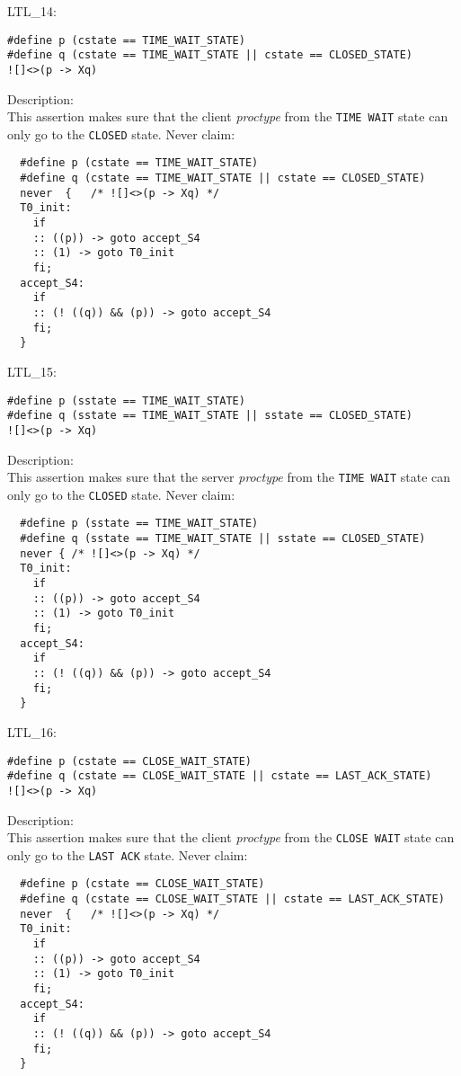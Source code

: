 \documentclass{WigReport}
\begin{document}
LTL\_14:\\
\begin{lstlisting}
#define p (cstate == TIME_WAIT_STATE)
#define q (cstate == TIME_WAIT_STATE || cstate == CLOSED_STATE)
![]<>(p -> Xq)
\end{lstlisting}
Description:\\
This assertion makes sure that the client \textit{proctype} from the \verb|TIME WAIT| state can only go to the \verb|CLOSED| state.
Never claim:\\
\begin{lstlisting}
  #define p (cstate == TIME_WAIT_STATE)
  #define q (cstate == TIME_WAIT_STATE || cstate == CLOSED_STATE)
  never  {   /* ![]<>(p -> Xq) */
  T0_init:
    if
    :: ((p)) -> goto accept_S4
    :: (1) -> goto T0_init
    fi;
  accept_S4:
    if
    :: (! ((q)) && (p)) -> goto accept_S4
    fi;
  }
\end{lstlisting}


LTL\_15:\\
\begin{lstlisting}
#define p (sstate == TIME_WAIT_STATE)
#define q (sstate == TIME_WAIT_STATE || sstate == CLOSED_STATE)
![]<>(p -> Xq)
\end{lstlisting}
Description:\\
This assertion makes sure that the server \textit{proctype} from the \verb|TIME WAIT| state can only go to the \verb|CLOSED| state.
Never claim:\\
\begin{lstlisting}
  #define p (sstate == TIME_WAIT_STATE)
  #define q (sstate == TIME_WAIT_STATE || sstate == CLOSED_STATE)
  never { /* ![]<>(p -> Xq) */
  T0_init:
    if
    :: ((p)) -> goto accept_S4
    :: (1) -> goto T0_init
    fi;
  accept_S4:
    if
    :: (! ((q)) && (p)) -> goto accept_S4
    fi;
  }
\end{lstlisting}


LTL\_16:\\
\begin{lstlisting}
#define p (cstate == CLOSE_WAIT_STATE)
#define q (cstate == CLOSE_WAIT_STATE || cstate == LAST_ACK_STATE)
![]<>(p -> Xq)
\end{lstlisting}
Description:\\
This assertion makes sure that the client \textit{proctype} from the \verb|CLOSE WAIT| state can only go to the \verb|LAST ACK| state.
Never claim:\\
\begin{lstlisting}
  #define p (cstate == CLOSE_WAIT_STATE)
  #define q (cstate == CLOSE_WAIT_STATE || cstate == LAST_ACK_STATE)
  never  {   /* ![]<>(p -> Xq) */
  T0_init:
    if
    :: ((p)) -> goto accept_S4
    :: (1) -> goto T0_init
    fi;
  accept_S4:
    if
    :: (! ((q)) && (p)) -> goto accept_S4
    fi;
  }
\end{lstlisting}
\end{document}
